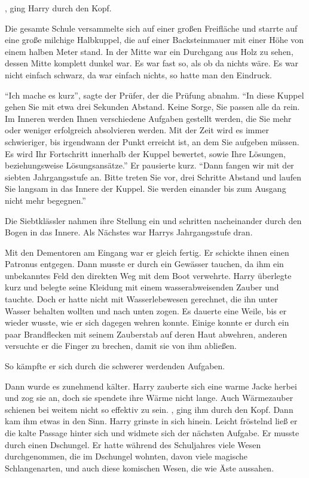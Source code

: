 , ging Harry durch den Kopf.

Die gesamte Schule versammelte sich auf einer großen Freifläche und starrte auf eine große milchige Halbkuppel, die auf einer Backsteinmauer mit einer Höhe von einem halben Meter stand. In der Mitte war ein Durchgang aus Holz zu sehen, dessen Mitte komplett dunkel war. Es war fast so, als ob da nichts wäre. Es war nicht einfach schwarz, da war einfach nichts, so hatte man den Eindruck.

\enquote{Ich mache es kurz}, sagte der Prüfer, der die Prüfung abnahm. \enquote{In diese Kuppel gehen Sie mit etwa drei Sekunden Abstand. Keine Sorge, Sie passen alle da rein. Im Inneren werden Ihnen verschiedene Aufgaben gestellt werden, die Sie mehr oder weniger erfolgreich absolvieren werden. Mit der Zeit wird es immer schwieriger, bis irgendwann der Punkt erreicht ist, an dem Sie aufgeben müssen. Es wird Ihr Fortschritt innerhalb der Kuppel bewertet, sowie Ihre Lösungen, beziehungsweise Lösungsansätze.} Er pausierte kurz. \enquote{Dann fangen wir mit der siebten Jahrgangsstufe an. Bitte treten Sie vor, drei Schritte Abstand und laufen Sie langsam in das Innere der Kuppel. Sie werden einander bis zum Ausgang nicht mehr begegnen.}

Die Siebtklässler nahmen ihre Stellung ein und schritten nacheinander durch den Bogen in das Innere. Als Nächstes war Harrys Jahrgangsstufe dran.

Mit den Dementoren am Eingang war er gleich fertig. Er schickte ihnen einen Patronus entgegen. Dann musste er durch ein Gewässer tauchen, da ihm ein unbekanntes Feld den direkten Weg mit dem Boot verwehrte. Harry überlegte kurz und belegte seine Kleidung mit einem wasserabweisenden Zauber und tauchte. Doch er hatte nicht mit Wasserlebewesen gerechnet, die ihn unter Wasser behalten wollten und nach unten zogen. Es dauerte eine Weile, bis er wieder wusste, wie er sich dagegen wehren konnte. Einige konnte er durch ein paar Brandflecken mit seinem Zauberstab auf deren Haut abwehren, anderen versuchte er die Finger zu brechen, damit sie von ihm abließen.

So kämpfte er sich durch die schwerer werdenden Aufgaben.

Dann wurde es zunehmend kälter. Harry zauberte sich eine warme Jacke herbei und zog sie an, doch sie spendete ihre Wärme nicht lange. Auch Wärmezauber schienen bei weitem nicht so effektiv zu sein. , ging ihm durch den Kopf. Dann kam ihm etwas in den Sinn.  Harry grinste in sich hinein. Leicht fröstelnd ließ er die kalte Passage hinter sich und widmete sich der nächsten Aufgabe. Er musste durch einen Dschungel. Er hatte während des Schuljahres viele Wesen durchgenommen, die im Dschungel wohnten, davon viele magische Schlangenarten, und auch diese komischen Wesen, die wie Äste aussahen.

